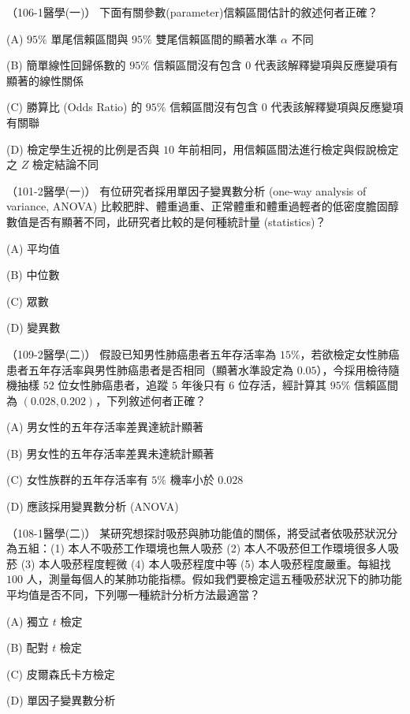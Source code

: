     \begin{docexam}{（106-1醫學(一)）}
        下面有關參數(parameter)信賴區間估計的敘述何者正確？

        (A) $95\%$ 單尾信賴區間與 $95\%$ 雙尾信賴區間的顯著水準 $\alpha$ 不同
        
        (B) 簡單線性回歸係數的 $95\%$ 信賴區間沒有包含 $0$ 代表該解釋變項與反應變項有顯著的線性關係

        (C) 勝算比 (Odds Ratio) 的 $95\%$ 信賴區間沒有包含 $0$ 代表該解釋變項與反應變項有關聯

        (D) 檢定學生近視的比例是否與 $10$ 年前相同，用信賴區間法進行檢定與假說檢定之 $Z$ 檢定結論不同
    \end{docexam}
    
    \begin{docexam}{（101-2醫學(一)）}
        有位研究者採用單因子變異數分析 (one-way analysis of variance, ANOVA) 比較肥胖、體重過重、正常體重和體重過輕者的低密度膽固醇數值是否有顯著不同，此研究者比較的是何種統計量 (statistics)？

        (A) 平均值
        
        (B) 中位數

        (C) 眾數

        (D) 變異數
    \end{docexam}
    
    \begin{docexam}{（109-2醫學(二)）}
        假設已知男性肺癌患者五年存活率為 $15\%$，若欲檢定女性肺癌患者五年存活率與男性肺癌患者是否相同（顯著水準設定為 $0.05$），今採用檢待隨機抽樣 $52$ 位女性肺癌患者，追蹤 $5$ 年後只有 $6$ 位存活，經計算其 $95\%$ 信賴區間為 $(0.028, 0.202)$，下列敘述何者正確？

        (A) 男女性的五年存活率差異達統計顯著
        
        (B) 男女性的五年存活率差異未達統計顯著

        (C) 女性族群的五年存活率有 $5\%$ 機率小於 $0.028$
 
        (D) 應該採用變異數分析 (ANOVA)
    \end{docexam}
    
    \begin{docexam}{（108-1醫學(二)）}
        某研究想探討吸菸與肺功能值的關係，將受試者依吸菸狀況分為五組：(1) 本人不吸菸工作環境也無人吸菸 (2) 本人不吸菸但工作環境很多人吸菸 (3) 本人吸菸程度輕微 (4) 本人吸菸程度中等 (5) 本人吸菸程度嚴重。每組找 $100$ 人，測量每個人的某肺功能指標。假如我們要檢定這五種吸菸狀況下的肺功能平均值是否不同，下列哪一種統計分析方法最適當？

        (A) 獨立 $t$ 檢定
        
        (B) 配對 $t$ 檢定

        (C) 皮爾森氏卡方檢定
 
        (D) 單因子變異數分析
    \end{docexam}
    
